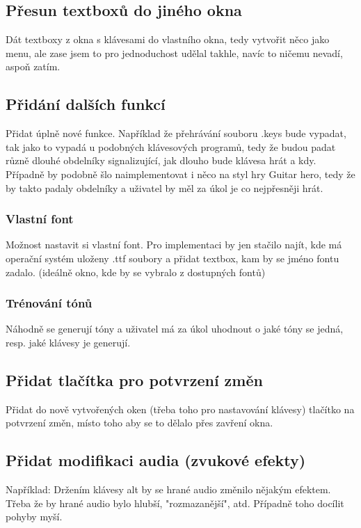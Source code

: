 \documentclass[12pt]{article}
\begin{document}
	\subsection{Přesun textboxů do jiného okna}
	Dát textboxy z okna s klávesami do vlastního okna, tedy vytvořit něco jako menu, ale zase jsem to pro jednoduchost udělal takhle, navíc to ničemu nevadí, aspoň zatím.
	\subsection{Přidání dalších funkcí}
	Přidat úplně nové funkce. Například že přehrávání souboru .keys bude vypadat, tak jako to vypadá u podobných klávesových programů, tedy že budou padat různě dlouhé obdelníky signalizující, jak dlouho bude klávesa hrát a kdy.
	\\
	Případně by podobně šlo naimplementovat i něco na styl hry Guitar hero, tedy že by takto padaly obdelníky a uživatel by měl za úkol je co nejpřesněji hrát.
		\subsubsection{Vlastní font}
	Možnost nastavit si vlastní font. Pro implementaci by jen stačilo najít, kde má operační systém uloženy .ttf soubory a přidat textbox, kam by se jméno fontu zadalo. (ideálně okno, kde by se vybralo z dostupných fontů)
	\subsubsection{Trénování tónů}
	Náhodně se generují tóny a uživatel má za úkol uhodnout o jaké tóny se jedná, resp. jaké klávesy je generují.
	\subsection{Přidat tlačítka pro potvrzení změn}
	Přidat do nově vytvořených oken (třeba toho pro nastavování klávesy) tlačítko na potvrzení změn, místo toho aby se to dělalo přes zavření okna.
	\subsection{Přidat modifikaci audia (zvukové efekty)}
	Například: Držením klávesy alt by se hrané audio změnilo nějakým efektem. Třeba že by hrané audio bylo hlubší, "rozmazanější", atd. Případně toho docílit pohyby myší.
\end{document}
